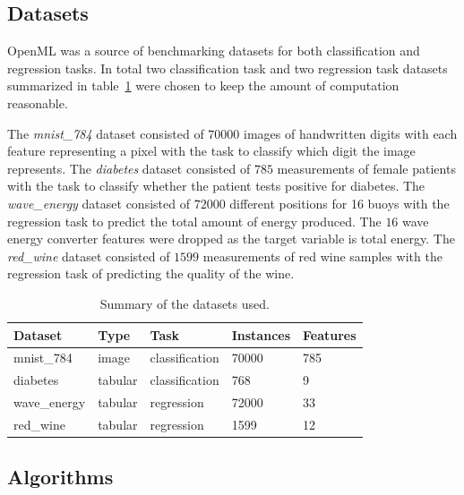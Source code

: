\subsection{Datasets}


OpenML \parencite{vanschorenOpenMLNetworkedScience2014} was a source of benchmarking datasets for both classification \parencite{bischlOpenMLBenchmarkingSuites2017} and regression \parencite{fischerOpenMLCTR23CuratedTabular2023} tasks. In total two classification task and two regression task datasets summarized in table~\ref{table:datasets} were chosen to keep the amount of computation reasonable.

The \emph{mnist\_784} dataset consisted of $70000$ images of handwritten digits with each feature representing a pixel with the task to classify which digit the image represents. The \emph{diabetes} dataset consisted of $785$ measurements of female patients with the task to classify whether the patient tests positive for diabetes. The \emph{wave\_energy} dataset consisted of $72000$ different positions for 16 buoys with the regression task to predict the total amount of energy produced. The $16$ wave energy converter features were dropped as the target variable is total energy. The \emph{red\_wine} dataset consisted of $1599$ measurements of red wine samples with the regression task of predicting the quality of the wine.

\begin{table}[h]
    \centering
    \begin{tabular}{lllll}
        \toprule
        Dataset      & Type    & Task           & Instances & Features \\
        \midrule
        mnist\_784   & image   & classification & 70000     & 785      \\
        diabetes     & tabular & classification & 768       & 9        \\
        wave\_energy & tabular & regression     & 72000     & 33       \\
        red\_wine    & tabular & regression     & 1599      & 12       \\
        \bottomrule
    \end{tabular}
    \caption{Summary of the datasets used.}
    \label{table:datasets}
\end{table}

\subsection{Algorithms}

